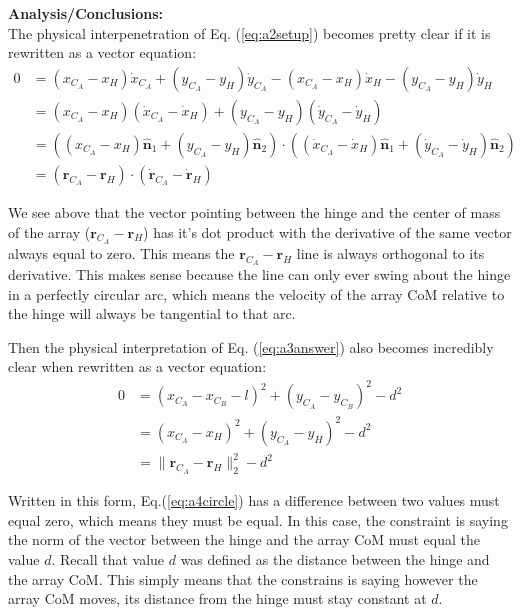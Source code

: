 \documentclass[titlepage]{article}
\begin{document}
\textbf{Analysis/Conclusions:}\\
The physical interpenetration of Eq. (\ref{eq:a2setup}) becomes pretty clear if it is rewritten as a vector equation:
\begin{equation}
	\begin{split}
		0&=(x_{C_A}-x_H)\dot{x}_{C_A}+(y_{C_A}-y_H)\dot{y}_{C_A}-(x_{C_A}-x_H)\dot{x}_H-(y_{C_A}-y_H)\dot{y}_H \\
		&=(x_{C_A}-x_H)(\dot{x}_{C_A}-\dot{x}_H)+(y_{C_A}-y_H)(\dot{y}_{C_A}-\dot{y}_H) \\
		&=\left((x_{C_A}-x_H)\hat{\boldsymbol{n}}_1+(y_{C_A}-y_H)\hat{\boldsymbol{n}}_2\right)\cdot\left((\dot{x}_{C_A}-\dot{x}_H)\hat{\boldsymbol{n}}_1+(\dot{y}_{C_A}-\dot{y}_H)\hat{\boldsymbol{n}}_2\right) \\
		&=(\boldsymbol{r}_{C_A}-\boldsymbol{r}_H)\cdot(\dot{\boldsymbol{r}}_{C_A}-\dot{\boldsymbol{r}}_H)
	\end{split}
	\label{eq:a4dot}
\end{equation}
\begin{mdframed}[linewidth=1pt, innertopmargin=10pt, innerbottommargin=10pt]
	We see above that the vector pointing between the hinge and the center of mass of the array ($\boldsymbol{r}_{C_A}-\boldsymbol{r}_H$) has it's dot product with the derivative of the same vector always equal to zero. This means the $\boldsymbol{r}_{C_A}-\boldsymbol{r}_H$ line is always orthogonal to its derivative. This makes sense because the line can only ever swing about the hinge in a perfectly circular arc, which means the velocity of the array CoM relative to the hinge will always be tangential to that arc. 
\end{mdframed}
Then the physical interpretation of Eq. (\ref{eq:a3answer}) also becomes incredibly clear when rewritten as a vector equation:
\begin{equation}
	\begin{split}
		0&=(x_{C_A}-x_{C_B}-l)^2+(y_{C_A}-y_{C_B})^2-d^2 \\
		&=(x_{C_A}-x_H)^2+(y_{C_A}-y_H)^2-d^2 \\
		&=\|\boldsymbol{r}_{C_A}-\boldsymbol{r}_H\|_2^2-d^2
	\end{split}
	\label{eq:a4circle}
\end{equation}
\begin{mdframed}[linewidth=1pt, innertopmargin=10pt, innerbottommargin=10pt]
	Written in this form, Eq.(\ref{eq:a4circle}) has a difference between two values must equal zero, which means they must be equal. In this case, the constraint is saying the norm of the vector between the hinge and the array CoM must equal the value $d$. Recall that value $d$ was defined as the distance between the hinge and the array CoM. This simply means that the constrains is saying however the array CoM moves, its distance from the hinge must stay constant at $d$.
\end{mdframed}
\end{document}
